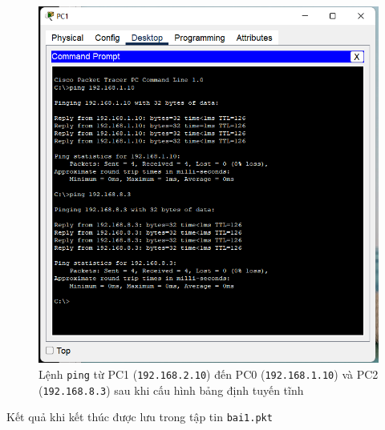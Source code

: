 \begin{enumerate}
\begin{figure}[H]
\begin{center}
\includegraphics[scale=1]{../figures/p1/p1-71}
\end{center}
\caption{Lệnh \texttt{ping} từ PC1 (\texttt{192.168.2.10}) đến PC0 (\texttt{192.168.1.10}) và PC2 (\texttt{192.168.8.3}) sau khi cấu hình bảng định tuyến tĩnh}
\end{figure}

Kết quả khi kết thúc được lưu trong tập tin \texttt{bai1.pkt}
\end{enumerate}
